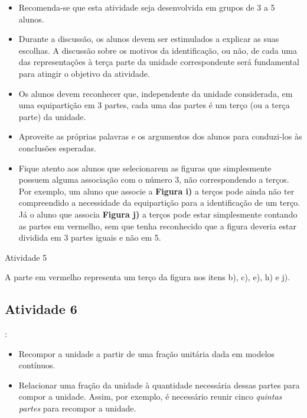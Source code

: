    \vspace{.1cm}
\begin{itemize} %
    \item       Recomenda-se que esta atividade seja desenvolvida em grupos de 3 a 5 alunos.
    \item       Durante a discussão, os alunos devem ser estimulados a explicar as suas escolhas. A discussão sobre os motivos da identificação, ou não, de cada uma das representações à terça parte da unidade correspondente será fundamental para atingir o objetivo da atividade.
    \item       Os alunos devem reconhecer que, independente da unidade considerada, em uma equipartição em 3 partes, cada uma das partes é um terço (ou a terça parte) da unidade.
    \item       Aproveite as próprias palavras e os argumentos dos alunos para conduzi-los às conclusões esperadas.
    \item       Fique atento aos alunos que selecionarem as figuras que simplesmente possuem alguma associação com o número 3, não correspondendo a terços. Por exemplo, um aluno que associe a       {\bf Figura i)} a terços pode ainda não ter compreendido a necessidade da equipartição para a identificação de um terço. Já o aluno que associa       {\bf Figura j)}       a terços pode estar simplesmente contando as partes em vermelho, sem que tenha reconhecido que a figura deveria estar dividida em 3 partes iguais e não em 5.
\end{itemize} %

\begin{resposta*}{Atividade 5}

A parte em vermelho representa um terço da figura nos itens b), c), e), h) e j).
\end{resposta*}

\pagebreak

\subsection{Atividade 6}
  \vspace{.1cm}:
\begin{itemize} %
    \item       Recompor a unidade a partir de uma fração unitária dada em modelos contínuos.
    \item       Relacionar uma fração da unidade à quantidade necessária dessas partes para compor a unidade. Assim, por exemplo, é necessário reunir cinco       {\it quintas partes}       para recompor a unidade.
\end{itemize} %


